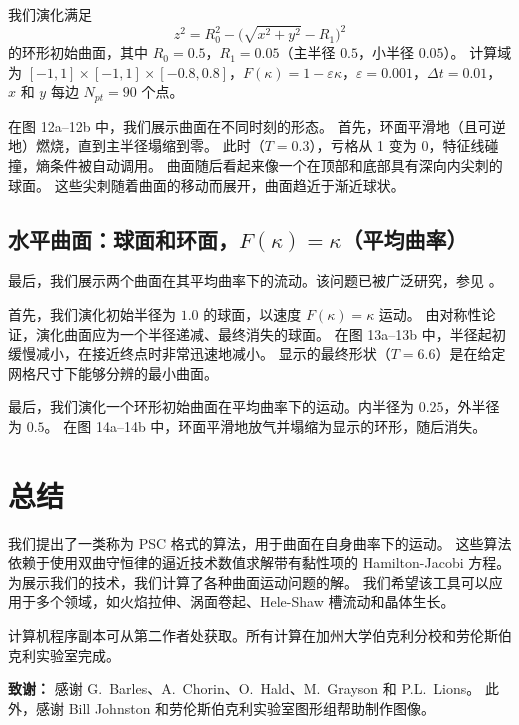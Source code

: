 \documentclass[11pt,a4paper]{article}
\begin{document}
我们演化满足
\begin{equation}
z^2 = R_0^2 - \bigl(\sqrt{x^2 + y^2} - R_1\bigr)^2
\end{equation}
的环形初始曲面，其中 $R_0 = 0.5$，$R_1 = 0.05$（主半径 $0.5$，小半径 $0.05$）。
计算域为 $[-1,1] \times [-1,1] \times [-0.8, 0.8]$，$F(\kappa) = 1 - \varepsilon\kappa$，$\varepsilon = 0.001$，$\Delta t = 0.01$，
$x$ 和 $y$ 每边 $N_{pt} = 90$ 个点。

在图 12a--12b 中，我们展示曲面在不同时刻的形态。
首先，环面平滑地（且可逆地）燃烧，直到主半径塌缩到零。
此时（$T=0.3$），亏格从 1 变为 0，特征线碰撞，熵条件被自动调用。
曲面随后看起来像一个在顶部和底部具有深向内尖刺的球面。
这些尖刺随着曲面的移动而展开，曲面趋近于渐近球状。

\subsection{水平曲面：球面和环面，$F(\kappa) = \kappa$（平均曲率）}

最后，我们展示两个曲面在其平均曲率下的流动。该问题已被广泛研究，参见 \cite{brakke1978, grayson1987b}。

首先，我们演化初始半径为 $1.0$ 的球面，以速度 $F(\kappa) = \kappa$ 运动。
由对称性论证，演化曲面应为一个半径递减、最终消失的球面。
在图 13a--13b 中，半径起初缓慢减小，在接近终点时非常迅速地减小。
显示的最终形状（$T=6.6$）是在给定网格尺寸下能够分辨的最小曲面。

最后，我们演化一个环形初始曲面在平均曲率下的运动。内半径为 $0.25$，外半径为 $0.5$。
在图 14a--14b 中，环面平滑地放气并塌缩为显示的环形，随后消失。

\section*{总结}

我们提出了一类称为 PSC 格式的算法，用于曲面在自身曲率下的运动。
这些算法依赖于使用双曲守恒律的逼近技术数值求解带有黏性项的 Hamilton-Jacobi 方程。
为展示我们的技术，我们计算了各种曲面运动问题的解。
我们希望该工具可以应用于多个领域，如火焰拉伸、涡面卷起、Hele-Shaw 槽流动和晶体生长。

\medskip
\noindent 计算机程序副本可从第二作者处获取。所有计算在加州大学伯克利分校和劳伦斯伯克利实验室完成。

\medskip
\noindent\textbf{致谢：} 感谢 G.~Barles、A.~Chorin、O.~Hald、M.~Grayson 和 P.L.~Lions。
此外，感谢 Bill Johnston 和劳伦斯伯克利实验室图形组帮助制作图像。
\end{document}
